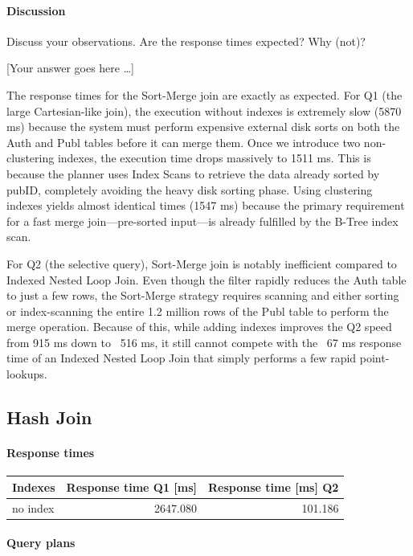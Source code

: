 \documentclass[11pt]{scrartcl}
\newcommand{\youranswerhere}{[Your answer goes here \ldots]}
\begin{document}
\paragraph{Discussion}

Discuss your observations. Are the response times expected? Why (not)?

\youranswerhere{The response times for the Sort-Merge join are exactly as expected. For Q1 (the large Cartesian-like join), the execution without indexes is extremely slow (5870 ms) because the system must perform expensive external disk sorts on both the Auth and Publ tables before it can merge them. Once we introduce two non-clustering indexes, the execution time drops massively to 1511 ms. This is because the planner uses Index Scans to retrieve the data already sorted by pubID, completely avoiding the heavy disk sorting phase. Using clustering indexes yields almost identical times (1547 ms) because the primary requirement for a fast merge join—pre-sorted input—is already fulfilled by the B-Tree index scan.

For Q2 (the selective query), Sort-Merge join is notably inefficient compared to Indexed Nested Loop Join. Even though the filter rapidly reduces the Auth table to just a few rows, the Sort-Merge strategy requires scanning and either sorting or index-scanning the entire 1.2 million rows of the Publ table to perform the merge operation. Because of this, while adding indexes improves the Q2 speed from 915 ms down to ~516 ms, it still cannot compete with the ~67 ms response time of an Indexed Nested Loop Join that simply performs a few rapid point-lookups.}

\subsection*{Hash Join}

\paragraph{Response times}\mbox{}

\begin{table}[H]
  \centering
  \begin{tabular}{l|r|r}
    Indexes & Response time Q1 [ms] & Response time [ms] Q2 \tabularnewline
    \hline
    no index & 2647.080 & 101.186 \tabularnewline
  \end{tabular}
\end{table}

\paragraph{Query plans}\mbox{}
\end{document}
